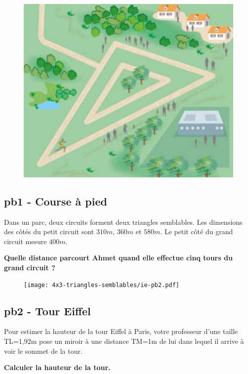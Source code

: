 \begin{minipage}[t]{0.3\textwidth}
  \begin{figure}[H]
    \includegraphics[width=0.7\linewidth]{4x3-triangles-semblables/ie-pb1.png}
  \end{figure}
\end{minipage}
\begin{minipage}[t]{0.65\textwidth}
  \subsection*{pb1 - Course à pied}

  Dans un parc, deux circuits forment deux triangles semblables. Les dimensions des côtés du petit circuit sont $310m$, $360m$ et $580m$. Le petit côté du grand circuit mesure $400 m$.

  \textbf{Quelle distance parcourt Ahmet quand elle effectue cinq tours du grand circuit ?}
\end{minipage}

\horrule{1px}

\begin{minipage}[t]{0.5\textwidth}
  \begin{figure}[H]
    \texttt{[image: 4x3-triangles-semblables/ie-pb2.pdf]}
  \end{figure}
\end{minipage}
\begin{minipage}[t]{0.45\textwidth}
  \subsection*{pb2 - Tour Eiffel}

  Pour estimer la hauteur de la tour Eiffel à Paris, votre professeur d'une taille TL=1,92m pose un miroir à une distance TM=1m de lui dans lequel il arrive à voir le sommet de la tour. 

\textbf{Calculer la hauteur de la tour.}
\end{minipage}

